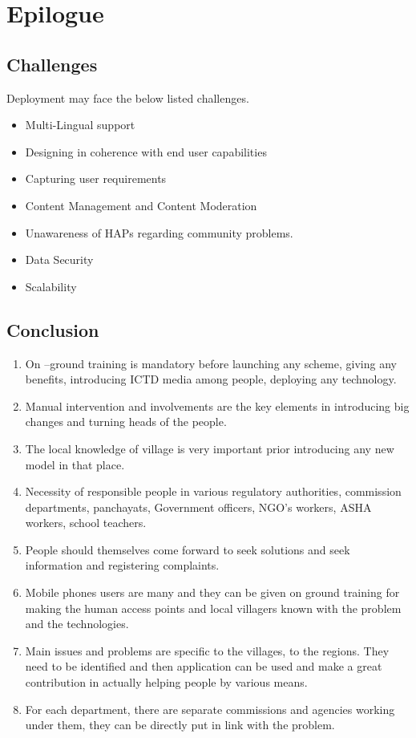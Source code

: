 \chapter{Epilogue}


\section{Challenges}
Deployment may face the below listed challenges.
\begin{itemize}
\item Multi-Lingual support
\item Designing in coherence with end user capabilities
\item Capturing user requirements
\item Content Management and Content Moderation
\item Unawareness of HAPs regarding community problems.
\item Data Security
\item Scalability
\end{itemize}

\section{Conclusion}

\begin{enumerate}
\item On –ground training is mandatory before launching any scheme, giving any
benefits, introducing ICTD media among people, deploying any technology.
\item Manual intervention and involvements are the key elements in introducing
big changes and turning heads of the people.
\item The local knowledge of village is very important prior introducing any new
model in that place.
\item Necessity of responsible people in various regulatory authorities, commission
departments, panchayats, Government officers, NGO’s workers, ASHA
workers, school teachers.
\item People should themselves come forward to seek solutions and seek
information and registering complaints.
\item Mobile phones users are many and they can be given on ground training for
making the human access points and local villagers known with the problem
and the technologies.
\item Main issues and problems are specific to the villages, to the regions. They
need to be identified and then application can be used and make a great
contribution in actually helping people by various means.
\item For each department, there are separate commissions and agencies working
under them, they can be directly put in link with the problem.

\end{enumerate}
